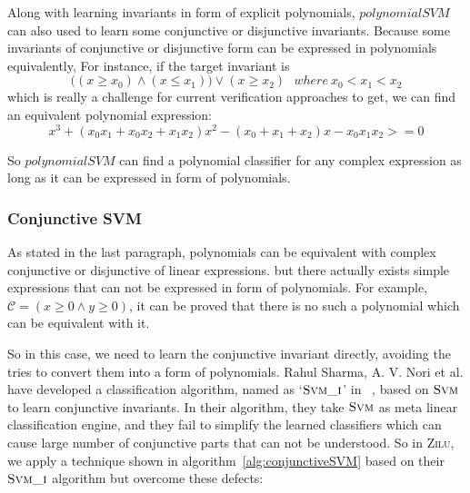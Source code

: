 Along with learning invariants in form of explicit polynomials,
$polynomialSVM$ can also used to learn some conjunctive or disjunctive invariants.
Because some invariants of conjunctive or disjunctive form can be expressed in polynomials equivalently,
For instance, if the target invariant is 
$$\big((x \ge x_0) \wedge (x \le x_1)\big) \vee (x \ge x_2) ~~~where\ x_0 < x_1 < x_2$$
which is really a challenge for current verification approaches to get,
we can find an equivalent polynomial expression:
$$x^3 + (x_0x_1 + x_0x_2 + x_1x_2)x^2 - (x_0 + x_1 + x_2)x - x_0x_1x_2 >= 0$$

So $polynomialSVM$ can find a polynomial classifier for any complex expression as long as it can be expressed in form of polynomials.


\subsubsection{Conjunctive SVM}
As stated in the last paragraph, polynomials can be equivalent with complex conjunctive or disjunctive of linear expressions.
but there actually exists simple expressions that can not be expressed in form of polynomials.
For example, $\mathcal{C} = (x \ge 0 \wedge y \ge 0)$,
it can be proved that there is no such a polynomial which can be equivalent with it.

So in this case, we need to learn the conjunctive invariant directly, avoiding the tries to convert them into a form of polynomials.
Rahul Sharma, A. V. Nori et al. have developed a classification algorithm, named as `$\textsc{Svm\_i}$' in ~\cite{sharma2012interpolants},
based on $\textsc{Svm}$ to learn conjunctive invariants.
In their algorithm, they take $\textsc{Svm}$ as meta linear classification engine, 
and they fail to simplify the learned classifiers which can cause large number of conjunctive parts that can not be understood.
So in \textsc{Zilu}, we apply a technique shown in algorithm~\ref{alg:conjunctiveSVM} based on their $\textsc{Svm\_i}$ algorithm but overcome these defects:

